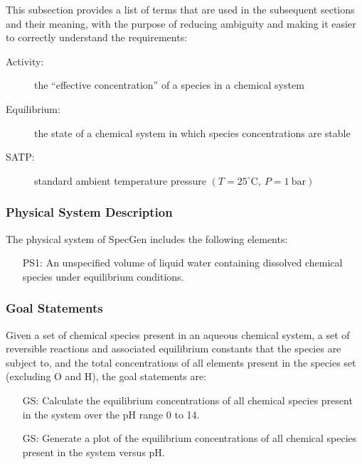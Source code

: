 \documentclass[12pt]{article}
\newcounter{goalnum} %
\newcommand{\progname}{SpecGen} %
\begin{document}
This subsection provides a list of terms that are used in the subsequent
sections and their meaning, with the purpose of reducing ambiguity and making it
easier to correctly understand the requirements:

\begin{description}
\item[Activity:] the ``effective concentration'' of a species in a chemical system
\item[Equilibrium:] the state of a chemical system in which species concentrations are stable
\item[SATP:] standard ambient temperature pressure
  $(T = 25^{\circ}\textrm{C}, ~P = 1~\textrm{bar})$  
\end{description}

\subsubsection{Physical System Description}

The physical system of \progname{} includes the following elements:
\begin{itemize}

\item[PS1:] An unspecified volume of liquid water containing dissolved chemical species under equilibrium conditions.

\end{itemize}


\subsubsection{Goal Statements}

\noindent Given a set of chemical species present in an aqueous chemical system, a set of reversible reactions and associated equilibrium constants that the species are subject to, and the total concentrations of all elements present in the species set (excluding O and H), the goal statements are:

\begin{itemize}

\item[GS\refstepcounter{goalnum}\thegoalnum \label{G_solve}:] Calculate the equilibrium concentrations of all chemical species present in the system over the pH range 0 to 14.
\item[GS\refstepcounter{goalnum}\thegoalnum \label{G_plot}:] Generate a plot of the equilibrium concentrations of all chemical species present in the system versus pH.
\end{itemize}
\end{document}
